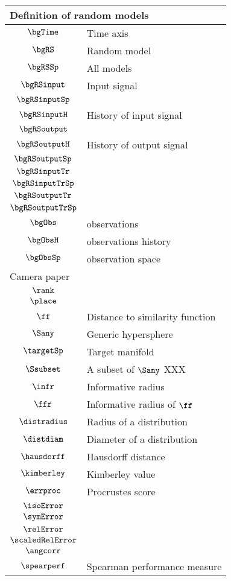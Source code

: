 \begin{longtable}{cl}
 \multicolumn{2}{l}{Definition of random models}\\ 
 \hline
$\bgTime$ &  Time axis\\ 
 $\bgRS$ &  Random model\\ 
 $\bgRSSp$ &  All models\\ 
 $\bgRSinput$ &  Input signal\\ 
 $\bgRSinputSp$ &  \\ 
 $\bgRSinputH$ &  History of input signal\\ 
 $\bgRSoutput$ & \\ 
 $\bgRSoutputH$ &  History of output signal\\ 
 $\bgRSoutputSp$ &  \\ 
 $\bgRSinputTr$ &  \\ 
 $\bgRSinputTrSp$ &  \\ 
 $\bgRSoutputTr$ &  \\ 
 $\bgRSoutputTrSp$ & \\ 
 $\bgObs$ &  observations\\ 
 $\bgObsH$ &  observations history\\ 
 $\bgObsSp$ &  observation space\\ 
 \multicolumn{2}{l}{Camera paper}\\ 
 \hline
$\rank$ & \\ 
 $\place$ & \\ 
 $\ff$ &  Distance to similarity function\\ 
 $\Sany$ &  Generic hypersphere\\ 
 $\targetSp$ &  Target manifold\\ 
 $\Ssubset$ &  A subset of $\Sany$  XXX\\ 
 $\infr$ &  Informative radius\\ 
 $\ffr$ &  Informative radius of $\ff$\\ 
 $\distradius$ &  Radius of a distribution\\ 
 $\distdiam$ &  Diameter of a distribution\\ 
 $\hausdorff$ &  Hausdorff distance\\ 
 $\kimberley$ &  Kimberley value\\ 
 $\errproc$ &  Procrustes score\\ 
 $\isoError$ & \\ 
 $\symError$ & \\ 
 $\relError$ & \\ 
 $\scaledRelError$ & \\ 
 $\angcorr$ & \\ 
 $\spearperf$ &  Spearman performance measure\\ 

\end{longtable}
